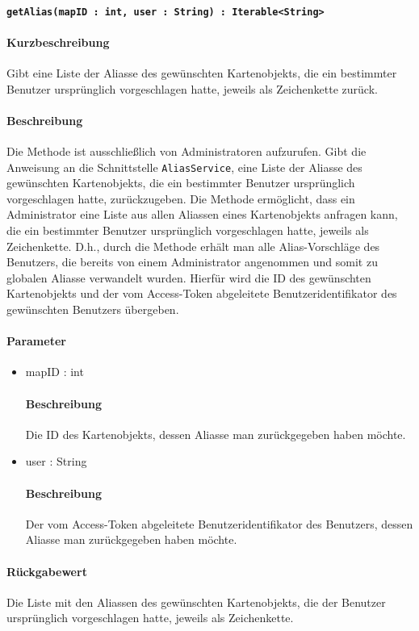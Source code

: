 \paragraph{\texttt{getAlias(mapID : int, user : String) : Iterable<String>}}%
\paragraph*{Kurzbeschreibung}
Gibt eine Liste der Aliasse des gewünschten Kartenobjekts, die ein bestimmter Benutzer ursprünglich vorgeschlagen hatte, jeweils als Zeichenkette zurück.
\paragraph*{Beschreibung}
Die Methode ist ausschließlich von Administratoren aufzurufen.
Gibt die Anweisung an die Schnittstelle \texttt{AliasService}, eine Liste der Aliasse des gewünschten Kartenobjekts, die ein bestimmter Benutzer ursprünglich vorgeschlagen hatte, zurückzugeben.
Die Methode ermöglicht, dass ein Administrator eine Liste aus allen Aliassen eines Kartenobjekts anfragen kann, die ein bestimmter Benutzer ursprünglich vorgeschlagen hatte, jeweils als Zeichenkette.
D.h., durch die Methode erhält man alle Alias-Vorschläge des Benutzers, die bereits von einem Administrator angenommen und somit zu globalen Aliasse verwandelt wurden.
Hierfür wird die ID des gewünschten Kartenobjekts und der vom Access-Token abgeleitete Benutzeridentifikator des gewünschten Benutzers übergeben.
\paragraph*{Parameter}
\begin{itemize}
    \item mapID : int
    		\paragraph*{Beschreibung}
    		Die ID des Kartenobjekts, dessen Aliasse man zurückgegeben haben möchte.
    	\item user : String
    		\paragraph*{Beschreibung}
    		Der vom Access-Token abgeleitete Benutzeridentifikator des Benutzers, dessen Aliasse man zurückgegeben haben möchte.
\end{itemize}
\paragraph*{Rückgabewert}
Die Liste mit den Aliassen des gewünschten Kartenobjekts, die der Benutzer ursprünglich vorgeschlagen hatte, jeweils als Zeichenkette.

